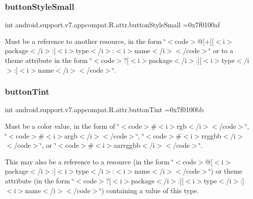 \subsubsection{\texorpdfstring{button\+Style\+Small}{buttonStyleSmall}}
{\footnotesize\ttfamily int android.\+support.\+v7.\+appcompat.\+R.\+attr.\+button\+Style\+Small =0x7f0100af\hspace{0.3cm}{\ttfamily [static]}}

Must be a reference to another resource, in the form \char`\"{}$<$code$>$@\mbox{[}+\mbox{]}\mbox{[}$<$i$>$package$<$/i$>$\+:\mbox{]}$<$i$>$type$<$/i$>$\+:$<$i$>$name$<$/i$>$$<$/code$>$\char`\"{} or to a theme attribute in the form \char`\"{}$<$code$>$?\mbox{[}$<$i$>$package$<$/i$>$\+:\mbox{]}\mbox{[}$<$i$>$type$<$/i$>$\+:\mbox{]}$<$i$>$name$<$/i$>$$<$/code$>$\char`\"{}. \mbox{\label{classandroid_1_1support_1_1v7_1_1appcompat_1_1R_1_1attr_ae026a3a33583df459d33e3c0a97759f4}} 
\subsubsection{\texorpdfstring{button\+Tint}{buttonTint}}
{\footnotesize\ttfamily int android.\+support.\+v7.\+appcompat.\+R.\+attr.\+button\+Tint =0x7f0100bb\hspace{0.3cm}{\ttfamily [static]}}

Must be a color value, in the form of \char`\"{}$<$code$>$\#$<$i$>$rgb$<$/i$>$$<$/code$>$\char`\"{}, \char`\"{}$<$code$>$\#$<$i$>$argb$<$/i$>$$<$/code$>$\char`\"{}, \char`\"{}$<$code$>$\#$<$i$>$rrggbb$<$/i$>$$<$/code$>$\char`\"{}, or \char`\"{}$<$code$>$\#$<$i$>$aarrggbb$<$/i$>$$<$/code$>$\char`\"{}. 

This may also be a reference to a resource (in the form \char`\"{}$<$code$>$@\mbox{[}$<$i$>$package$<$/i$>$\+:\mbox{]}$<$i$>$type$<$/i$>$\+:$<$i$>$name$<$/i$>$$<$/code$>$\char`\"{}) or theme attribute (in the form \char`\"{}$<$code$>$?\mbox{[}$<$i$>$package$<$/i$>$\+:\mbox{]}\mbox{[}$<$i$>$type$<$/i$>$\+:\mbox{]}$<$i$>$name$<$/i$>$$<$/code$>$\char`\"{}) containing a value of this type. \mbox{\label{classandroid_1_1support_1_1v7_1_1appcompat_1_1R_1_1attr_af9ff20ba654b1ae027744dc8217560e1}} 
